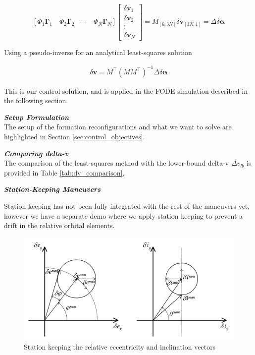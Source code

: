 \begin{equation}
\left[
\Phi_1 \mathbf{\Gamma}_1 \quad
\Phi_2 \mathbf{\Gamma}_2 \quad
\cdots \quad
\Phi_N \mathbf{\Gamma}_N
\right]
\begin{bmatrix}
\delta \mathbf{v}_1 \\
\delta \mathbf{v}_2 \\
\vdots \\
\delta \mathbf{v}_N
\end{bmatrix}
= M_{[6,3N]} \delta \mathbf{v}_{[3N,1]} = \Delta \delta \boldsymbol{\alpha}
\end{equation}

Using a pseudo-inverse for an analytical least-squares solution 

\begin{align}
    \delta \mathbf{v} = M^\top (M M^\top)^{-1} \Delta \delta \boldsymbol{\alpha}
\end{align}

This is our control solution, and is applied in the FODE simulation described in the following section.

\textbf{\textit{Setup Formulation}} \\
The setup of the formation reconfigurations and what we want to solve are highlighted in Section \ref{sec:control_objectives}.

\textbf{\textit{Comparing delta-v}} \\
The comparison of the least-squares method with the lower-bound delta-v $\Delta v_{lb}$ is provided in Table \ref{tab:dv_comparison}.

\textbf{\textit{Station-Keeping Maneuvers}}

Station keeping has not been fully integrated with the rest of the maneuvers yet, however we have a separate demo where we apply station keeping to prevent a drift in the relative orbital elements.
\begin{figure}[H]
    \centering
    \includegraphics[width=0.75\linewidth]{sim//figures//PS5/station_keeping_man_damico.png}
    \caption{Station keeping the relative eccentricity and inclination vectors \cite{damicothesis}}
    \label{fig:station_keeping_guide}
\end{figure}

